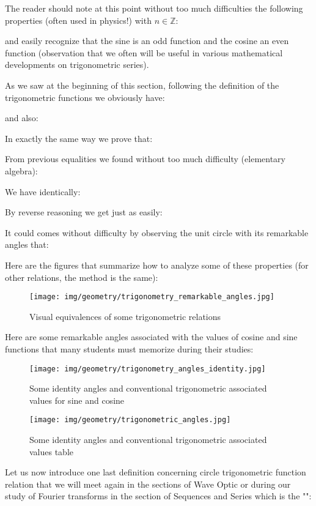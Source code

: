 The reader should note at this point without too much difficulties the following properties (often used in physics!) with $n \in \mathbb{Z}$:
	
and easily recognize that the sine is an odd function and the cosine an even function (observation that we often will be useful in various mathematical developments on trigonometric series).

As we saw at the beginning of this section, following the definition of the trigonometric functions we obviously have:
	
	and also:
	
	In exactly the same way we prove that:
	
	From previous equalities we found without too much difficulty (elementary algebra):
	
	We have identically:
	
	By reverse reasoning we get just as easily:
	
	It could comes without difficulty by observing the unit circle with its remarkable angles that:
	
	Here are the figures that summarize how to analyze some of these properties (for other relations, the method is the same):
	\begin{figure}[H]
		\centering
		\texttt{[image: img/geometry/trigonometry\_remarkable\_angles.jpg]}
		\caption{Visual equivalences of some trigonometric relations}
	\end{figure}
	Here are some remarkable angles associated with the values of cosine and sine functions that many students must memorize during their studies:
	\begin{figure}[H]
		\centering
		\texttt{[image: img/geometry/trigonometry\_angles\_identity.jpg]}
		\caption{Some identity angles and conventional trigonometric associated values for sine and cosine}
	\end{figure}

	\begin{figure}[H]
		\centering
		\texttt{[image: img/geometry/trigonometric\_angles.jpg]}
		\caption{Some identity angles and conventional trigonometric associated values table}
	\end{figure}
	Let us now introduce one last definition concerning circle trigonometric function relation that we will meet again in the sections of Wave Optic or during our study of Fourier transforms in the section of Sequences and Series which is the "":
	
